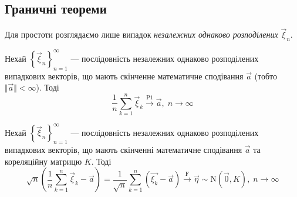 \subsection{Граничні теореми}
Для простоти розглядаємо лише випадок \emph{незалежних однаково розподілених} $\vec{\xi}_n$.
\begin{theorem*}
    Нехай $\left\{ \vec{\xi}_n\right\}_{n=1}^{\infty}$ --- послідовність незалежних однаково розподілених випадкових векторів, що мають скінченне
    математичне сподівання $\vec{a}$ (тобто $\Vert \vec{a} \Vert < \infty$). Тоді 
    $$
    \frac{1}{n} \sum\limits_{k=1}^n \vec{\xi}_k \overset{\mathrm{P1}}{\longrightarrow} \vec{a}, \; n \to \infty
    $$
\end{theorem*}
\begin{theorem*}
    Нехай $\left\{ \vec{\xi}_n\right\}_{n=1}^{\infty}$ --- послідовність незалежних однаково розподілених випадкових векторів, що мають скінченні
    математичне сподівання $\vec{a}$ та кореляційну матрицю $K$. Тоді
    $$
    \sqrt{n}\left( \frac{1}{n} \sum\limits_{k=1}^n \vec{\xi}_k - \vec{a}\right) = 
    \frac{1}{\sqrt{n}} \sum\limits_{k=1}^n \left( \vec{\xi_k} - \vec{a}\right) \overset{\mathrm{F}}{\longrightarrow} \vec{\eta} \sim \mathrm{N}\left(\vec{0}, K\right), \; n\to\infty
    $$
\end{theorem*}